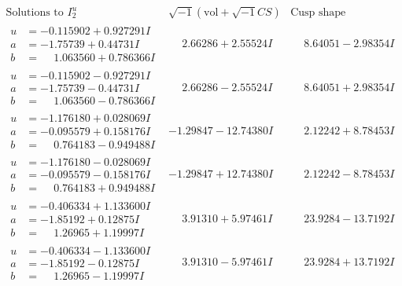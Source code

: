 \documentclass[1p]{elsarticle_modified}
\theoremstyle{definition}
\newcommand{\I}{\sqrt{-1}}
\begin{document}
$$\begin{array}{c|c|c}  
\text{Solutions to }I^u_{2}& \I (\text{vol} + \sqrt{-1}CS) & \text{Cusp shape}\\
 \hline 
\begin{aligned}
u &= -0.115902 + 0.927291 I \\
a &= -1.75739 + 0.44731 I \\
b &= \phantom{-}1.063560 + 0.786366 I\end{aligned}
 & \phantom{-}2.66286 + 2.55524 I & \phantom{-}8.64051 - 2.98354 I \\ \hline\begin{aligned}
u &= -0.115902 - 0.927291 I \\
a &= -1.75739 - 0.44731 I \\
b &= \phantom{-}1.063560 - 0.786366 I\end{aligned}
 & \phantom{-}2.66286 - 2.55524 I & \phantom{-}8.64051 + 2.98354 I \\ \hline\begin{aligned}
u &= -1.176180 + 0.028069 I \\
a &= -0.095579 + 0.158176 I \\
b &= \phantom{-}0.764183 - 0.949488 I\end{aligned}
 & -1.29847 - 12.74380 I & \phantom{-}2.12242 + 8.78453 I \\ \hline\begin{aligned}
u &= -1.176180 - 0.028069 I \\
a &= -0.095579 - 0.158176 I \\
b &= \phantom{-}0.764183 + 0.949488 I\end{aligned}
 & -1.29847 + 12.74380 I & \phantom{-}2.12242 - 8.78453 I \\ \hline\begin{aligned}
u &= -0.406334 + 1.133600 I \\
a &= -1.85192 + 0.12875 I \\
b &= \phantom{-}1.26965 + 1.19997 I\end{aligned}
 & \phantom{-}3.91310 + 5.97461 I & \phantom{-}23.9284 - 13.7192 I \\ \hline\begin{aligned}
u &= -0.406334 - 1.133600 I \\
a &= -1.85192 - 0.12875 I \\
b &= \phantom{-}1.26965 - 1.19997 I\end{aligned}
 & \phantom{-}3.91310 - 5.97461 I & \phantom{-}23.9284 + 13.7192 I \\ \hline\begin{aligned}

\end{aligned}
\end{array}$$
\end{document}
